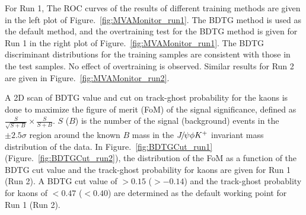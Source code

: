 For Run 1, The ROC curves of the results of different training methods are given in the left plot of Figure.~\ref{fig:MVAMonitor_run1}.  
The BDTG method is used as the default method, 
and the overtraining test for the BDTG method is given for Run 1 in the right plot of Figure.~\ref{fig:MVAMonitor_run1}. 
The BDTG discriminant distributions for the training samples are consistent with those in the test samples. 
No effect of overtraining is observed.
Similar results for Run 2 are given in Figure.~\ref{fig:MVAMonitor_run2}. 

A 2D scan of BDTG value and cut on track-ghost probability for the kaons is done to maximize the figure of merit (FoM) of the signal significance, 
defined as $\frac{S}{\sqrt{S+B}} \times \frac{S}{S+B}$.  
$S$ ($B$) is the number of the signal (background) events in the $\pm2.5\sigma$ region around the known $B$ mass in the
 ${{J\mskip -3mu/\mskip -2mu\psi}}\phi K^+$ invariant mass distribution of the data. 
In Figure.~\ref{fig:BDTGCut_run1} (Figure.~\ref{fig:BDTGCut_run2}), 
the distribution of the FoM as a function of the BDTG cut value and 
the track-ghost probability for kaons are given for Run 1 (Run 2). A BDTG cut value of $>0.15$ ($>-0.14$) and 
the track-ghost probablity for kaons of $<0.47$ ($<0.40$) are determined as the default working point for Run 1 (Run 2).


